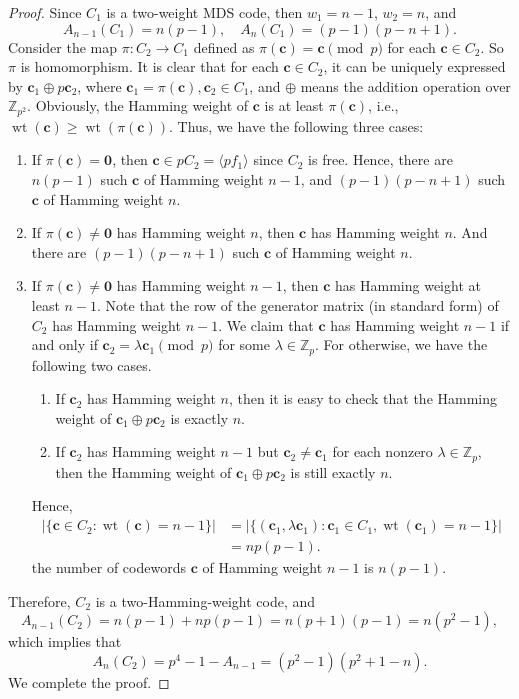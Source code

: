 \documentclass[10pt,a4paper]{amsart}
\renewcommand{\vec}[1]{\boldsymbol{#1}} %
\DeclareMathOperator{\wt}{wt}
\begin{document}
\begin{proof}
	Since $C_1$ is a two-weight MDS code, then $w_1 = n-1$, $w_2 = n$, and
	\[ A_{n-1}(C_1) = n(p-1), \quad A_n(C_1) = (p-1)(p-n+1). \]
	Consider the map $\pi: C_2 \rightarrow C_1$ defined as $\pi(\vec{c}) = \vec{c} \pmod{p}$ for each $\vec{c} \in C_2$.
	So $\pi$ is homomorphism.
	It is clear that for each $\vec{c} \in C_2$, it can be uniquely expressed by $\vec{c}_1 \oplus p \vec{c}_2$, where $\vec{c}_1 = \pi(\vec{c}),\vec{c}_2 \in C_1$, and $\oplus$ means the addition operation over $\mathbb{Z}_{p^2}$.
	Obviously, the Hamming weight of $\vec{c}$ is at least $\pi(\vec{c})$, i.e., $\wt(\vec{c}) \geqslant \wt(\pi(\vec{c}))$.
	Thus, we have the following three cases:
	\begin{enumerate}
		\item[(1)] If $\pi(\vec{c}) = \vec{0}$, then $\vec{c} \in pC_2 = \langle pf_1 \rangle$ since $C_2$ is free.
		Hence, there are $n(p-1)$ such $\vec{c}$ of Hamming weight $n-1$, and $(p-1)(p-n+1)$ such $\vec{c}$ of Hamming weight $n$.
		
		\item[(2)] If $\pi(\vec{c}) \neq \vec{0}$ has Hamming weight $n$, then $\vec{c}$ has Hamming weight $n$.
		And there are $(p-1)(p-n+1)$ such $\vec{c}$ of Hamming weight $n$.
		
		\item[(3)] If $\pi(\vec{c}) \neq \vec{0}$ has Hamming weight $n-1$, then $\vec{c}$ has Hamming weight at least $n-1$.
		Note that the row of the generator matrix (in standard form) of $C_2$ has Hamming weight $n-1$.
		We claim that $\vec{c}$ has Hamming weight $n-1$ if and only if $\vec{c}_2 = \lambda \vec{c}_1 \pmod{p}$ for some $\lambda \in \mathbb{Z}_p$.
		For otherwise, we have the following two cases.
		\begin{enumerate}
			\item If $\vec{c}_2$ has Hamming weight $n$, then it is easy to check that the Hamming weight of $\vec{c}_1 \oplus p \vec{c}_2$ is exactly $n$.
			
			\item If $\vec{c}_2$ has Hamming weight $n-1$ but $\vec{c}_2 \neq \vec{c}_1$ for each nonzero $\lambda \in \mathbb{Z}_p$, then the Hamming weight of $\vec{c}_1 \oplus p \vec{c}_2$ is still exactly $n$.
		\end{enumerate}
		Hence,
		\begin{align*}
			|\{ \vec{c} \in C_2: \wt(\vec{c}) = n-1 \}| & = |\{ (\vec{c}_1, \lambda \vec{c}_1): \vec{c}_1 \in C_1, \wt(\vec{c}_1) = n-1 \}| \\
			& = np(p-1).
		\end{align*}
		the number of codewords $\vec{c}$ of Hamming weight $n-1$ is $n(p-1)$.
	\end{enumerate}
	Therefore, $C_2$ is a two-Hamming-weight code, and
	\[ A_{n-1}(C_2) = n(p-1) + np(p-1) = n(p+1)(p-1) = n(p^2 - 1), \]
	which implies that
	\[ A_{n}(C_2) = p^4 - 1 - A_{n-1} = (p^2 - 1)(p^2 + 1 - n). \]
	We complete the proof.
\end{proof}
\end{document}
